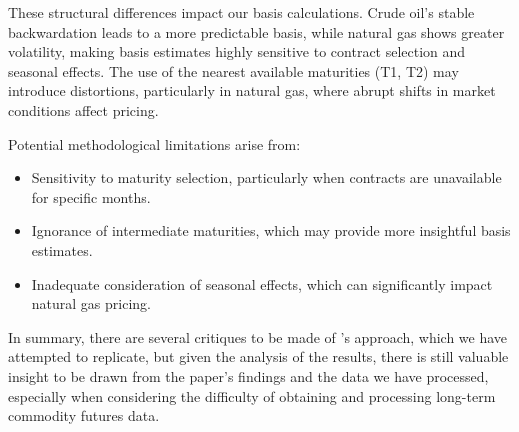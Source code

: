 \documentclass[12pt]{article}
\begin{document}
These structural differences impact our basis calculations. Crude oil’s stable backwardation leads to a more predictable basis, while natural gas shows greater volatility, making basis estimates highly sensitive to contract selection and seasonal effects. The use of the nearest available maturities (T1, T2) may introduce distortions, particularly in natural gas, where abrupt shifts in market conditions affect pricing.

Potential methodological limitations arise from:
\begin{itemize}
    \item Sensitivity to maturity selection, particularly when contracts are unavailable for specific months.
    \item Ignorance of intermediate maturities, which may provide more insightful basis estimates.
    \item Inadequate consideration of seasonal effects, which can significantly impact natural gas pricing.
\end{itemize}

In summary, there are several critiques to be made of \cite{Yang2013}'s approach, which we have attempted to replicate,
but given the analysis of the results,
there is still valuable insight to be drawn from the paper's findings and the data we have processed,
especially when considering the difficulty of obtaining and processing long-term commodity futures data.


\clearpage




\end{document}
